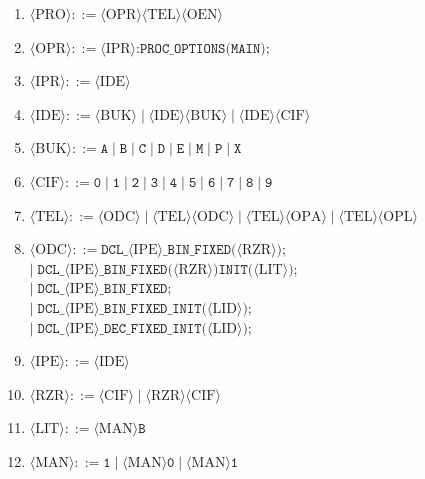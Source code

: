 \documentclass[a4paper,14pt]{extarticle}
\begin{document}
\begin{enumerate}
  \item $\langle\text{PRO}\rangle ::= \langle\text{OPR}\rangle\langle\text{TEL}\rangle\langle\text{OEN}\rangle$
  \item $\langle\text{OPR}\rangle ::= \langle\text{IPR}\rangle\texttt{:PROC\_OPTIONS(MAIN);}$
  \item $\langle\text{IPR}\rangle ::= \langle\text{IDE}\rangle$
  \item $\langle\text{IDE}\rangle ::= \langle\text{BUK}\rangle \mid \langle\text{IDE}\rangle\langle\text{BUK}\rangle \mid \langle\text{IDE}\rangle\langle\text{CIF}\rangle$
  \item $\langle\text{BUK}\rangle ::= \texttt{A} \mid \texttt{B} \mid \texttt{C} \mid \texttt{D} \mid \texttt{E} \mid \texttt{M} \mid \texttt{P} \mid \texttt{X}$
  \item $\langle\text{CIF}\rangle ::= \texttt{0} \mid \texttt{1} \mid \texttt{2} \mid \texttt{3} \mid \texttt{4} \mid \texttt{5} \mid \texttt{6} \mid \texttt{7} \mid \texttt{8} \mid \texttt{9}$
  \item $\langle\text{TEL}\rangle ::= \langle\text{ODC}\rangle \mid \langle\text{TEL}\rangle\langle\text{ODC}\rangle \mid \langle\text{TEL}\rangle\langle\text{OPA}\rangle \mid \langle\text{TEL}\rangle\langle\text{OPL}\rangle$
  \item $\langle\text{ODC}\rangle ::= \texttt{DCL\_}\langle\text{IPE}\rangle\texttt{\_BIN\_FIXED(}\langle\text{RZR}\rangle\texttt{);}$\\
        $\mid\; \texttt{DCL\_}\langle\text{IPE}\rangle\texttt{\_BIN\_FIXED(}\langle\text{RZR}\rangle\texttt{)INIT(}\langle\text{LIT}\rangle\texttt{);}$\\
        \textit{$\mid\; \texttt{DCL\_}\langle\text{IPE}\rangle\texttt{\_BIN\_FIXED;}$}\\
        \textit{$\mid\; \texttt{DCL\_}\langle\text{IPE}\rangle\texttt{\_BIN\_FIXED\_INIT(}\langle\text{LID}\rangle\texttt{);}$}\\
        \textit{$\mid\; \texttt{DCL\_}\langle\text{IPE}\rangle\texttt{\_DEC\_FIXED\_INIT(}\langle\text{LID}\rangle\texttt{);}$}
  \item $\langle\text{IPE}\rangle ::= \langle\text{IDE}\rangle$
  \item $\langle\text{RZR}\rangle ::= \langle\text{CIF}\rangle \mid \langle\text{RZR}\rangle\langle\text{CIF}\rangle$
  \item $\langle\text{LIT}\rangle ::= \langle\text{MAN}\rangle\texttt{B}$
  \item $\langle\text{MAN}\rangle ::= \texttt{1} \mid \langle\text{MAN}\rangle\texttt{0} \mid \langle\text{MAN}\rangle\texttt{1}$

\end{enumerate}
\end{document}
